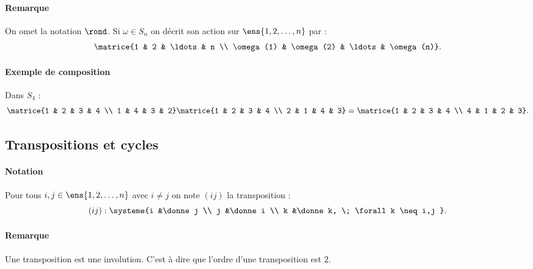 \documentclass{mybourbaki}
\newcommand{\card}{\sharp}
\begin{document}
\paragraph{Remarque}On omet la notation $\rond$. Si $\omega \in S_n$ on décrit son action sur $\ens{1,2,\ldots,n}$ par : \[ \matrice{1 & 2 & \ldots & n \\ \omega(1) & \omega(2) & \ldots & \omega(n)}.\]

\paragraph{Exemple de composition}Dans $S_4$ : \[ \matrice{1 & 2 & 3 & 4 \\ 1 & 4 & 3 & 2} \matrice{1 & 2 & 3 & 4 \\ 2 & 1 & 4 & 3} = \matrice{1 & 2 & 3 & 4 \\ 4 & 1 & 2 & 3}.\]
\subsection{Transpositions et cycles}
\paragraph{Notation}Pour tous $i,j \in \ens{1,2,\ldots,n}$ avec $i\neq j$ on note $(ij)$ la transposition : \[ (ij) : \systeme{i &\donne j \\ j &\donne i \\ k &\donne k, \; \forall k \neq i,j }. \]
\paragraph{Remarque}Une transposition est une involution. C'est à dire que l'ordre d'une transposition est $2$.

\proposition{ 
$\card S_n = n!$.
}{}
\end{document}
